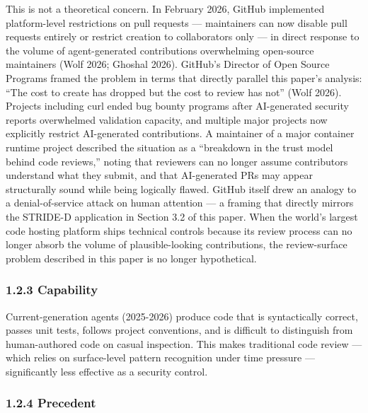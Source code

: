 \documentclass[a4paper,11pt]{report}
\begin{document}
This is not a theoretical concern. In February 2026, GitHub implemented
platform-level restrictions on pull requests --- maintainers can now
disable pull requests entirely or restrict creation to collaborators
only --- in direct response to the volume of agent-generated
contributions overwhelming open-source maintainers (Wolf 2026; Ghoshal
2026). GitHub's Director of Open Source Programs framed the problem in
terms that directly parallel this paper's analysis: ``The cost to create
has dropped but the cost to review has not'' (Wolf 2026). Projects
including curl ended bug bounty programs after AI-generated security
reports overwhelmed validation capacity, and multiple major projects now
explicitly restrict AI-generated contributions. A maintainer of a major
container runtime project described the situation as a ``breakdown in
the trust model behind code reviews,'' noting that reviewers can no
longer assume contributors understand what they submit, and that
AI-generated PRs may appear structurally sound while being logically
flawed. GitHub itself drew an analogy to a denial-of-service attack on
human attention --- a framing that directly mirrors the STRIDE-D
application in Section 3.2 of this paper. When the world's largest code
hosting platform ships technical controls because its review process can
no longer absorb the volume of plausible-looking contributions, the
review-surface problem described in this paper is no longer
hypothetical.

\hypertarget{capability}{%
\subsubsection{1.2.3 Capability}\label{capability}}

Current-generation agents (2025-2026) produce code that is syntactically
correct, passes unit tests, follows project conventions, and is
difficult to distinguish from human-authored code on casual inspection.
This makes traditional code review --- which relies on surface-level
pattern recognition under time pressure --- significantly less effective
as a security control.

\hypertarget{precedent}{%
\subsubsection{1.2.4 Precedent}\label{precedent}}
\end{document}
